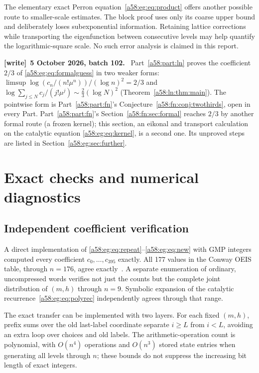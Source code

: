 \documentclass[11pt,letterpaper]{article}
\theoremstyle{remark}
\newenvironment{writenote}[1][]{\par\smallskip\begingroup\small
 \noindent\textbf{[write]}\if\relax\detokenize{#1}\relax\else~\textbf{#1.}\fi\ }%
 {\par\endgroup\smallskip}
\begin{document}
The elementary exact Perron equation~\eqref{a58:eg:eq:product} offers another possible route to smaller-scale estimates. The block proof uses only its coarse upper bound and deliberately loses subexponential information. Retaining lattice corrections while transporting the eigenfunction between consecutive levels may help quantify the logarithmic-square scale. No such error analysis is claimed in this report.

\begin{writenote}[5 October 2026, batch 102]
Part~\ref{a58:part:ln} proves the coefficient $2/3$ of \eqref{a58:eg:eq:formalguess} in two weaker forms: $\limsup\log(c_n/(n!\mu^n))/(\log n)^2=2/3$ and $\log\sum_{j\le N}c_j/(j!\mu^j)\sim\frac23(\log N)^2$ (Theorem~\ref{a58:ln:thm:main}). The pointwise form is Part~\ref{a58:part:fn}'s Conjecture~\ref{a58:fn:conj:twothirds}, open in every Part. Part~\ref{a58:part:fn}'s Section~\ref{a58:fn:sec:formal} reaches $2/3$ by another formal route (a frozen kernel); this section, an eikonal and transport calculation on the catalytic equation \eqref{a58:eg:eq:kernel}, is a second one. Its unproved steps are listed in Section~\ref{a58:eg:sec:further}.
\end{writenote}

\section{Exact checks and numerical diagnostics}\label{a58:eg:sec:checks}
\subsection{Independent coefficient verification}
A direct implementation of \eqref{a58:eg:eq:repeat}--\eqref{a58:eg:eq:new} with GMP integers computed every coefficient $c_0,\ldots,c_{395}$ exactly. All 177 values in the Conway OEIS table, through $n=176$, agree exactly~\cite{ConwayData}. A separate enumeration of ordinary, uncompressed words verifies not just the counts but the complete joint distribution of $(m,h)$ through $n=9$. Symbolic expansion of the catalytic recurrence~\eqref{a58:eg:eq:polyrec} independently agrees through that range.

The exact transfer can be implemented with two layers. For each fixed $(m,h)$, prefix sums over the old last-label coordinate separate $i\ge L$ from $i<L$, avoiding an extra loop over choices and old labels. The arithmetic-operation count is polynomial, with $O(n^4)$ operations and $O(n^3)$ stored state entries when generating all levels through $n$; these bounds do not suppress the increasing bit length of exact integers.
\end{document}
